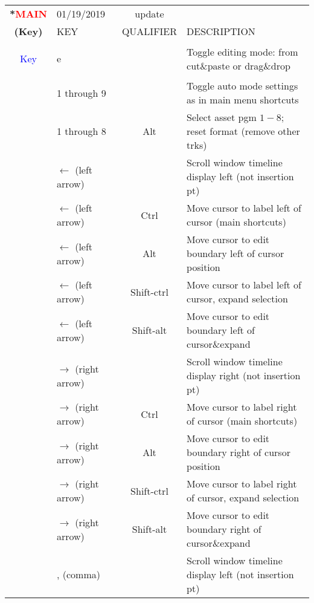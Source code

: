 \begin{center}
    \small 
    \begin{longtable}{ >{\bfseries}c l c p{6cm}}             
        \toprule
        \multirow{2}*{\textcolor{red}{MAIN}} & 01/19/2019 & update & \\
        \noalign{\smallskip}
        \cline{2-4}
        \noalign{\smallskip}
        (Key) & KEY & QUALIFIER & DESCRIPTION\\        
        \midrule
        \endhead        
        
        \textcolor{blue}{Key} & e & & Toggle editing mode: from cut\&paste or drag\&drop \\        
        & 1 through 9 &  & Toggle auto mode settings as in main menu shortcuts \\        
        & 1 through 8 & Alt & Select asset pgm $1-8$; reset format (remove other trks) \\        
        & $\leftarrow$ (left arrow) &  & Scroll window timeline display left (not insertion pt) \\        
        & $\leftarrow$ (left arrow) & Ctrl & Move cursor to label left of cursor (main shortcuts) \\        
        & $\leftarrow$ (left arrow) & Alt & Move cursor to edit boundary left of cursor position \\        
        & $\leftarrow$ (left arrow) & Shift-ctrl & Move cursor to label left of cursor, expand selection \\        
        & $\leftarrow$ (left arrow) & Shift-alt & Move cursor to edit boundary left of cursor\&expand \\        
        & $\rightarrow$ (right arrow) &  & Scroll window timeline display right (not insertion pt) \\        
        & $\rightarrow$ (right arrow) & Ctrl & Move cursor to label right of cursor (main shortcuts) \\        
        & $\rightarrow$ (right arrow) & Alt & Move cursor to edit boundary right of cursor position \\        
        & $\rightarrow$ (right arrow) & Shift-ctrl & Move cursor to label right of cursor, expand selection \\        
        & $\rightarrow$ (right arrow) & Shift-alt & Move cursor to edit boundary right of cursor\&expand \\        
        & , (comma) &  & Scroll window timeline display left (not insertion pt) \\        

\end{longtable}
\end{center}
